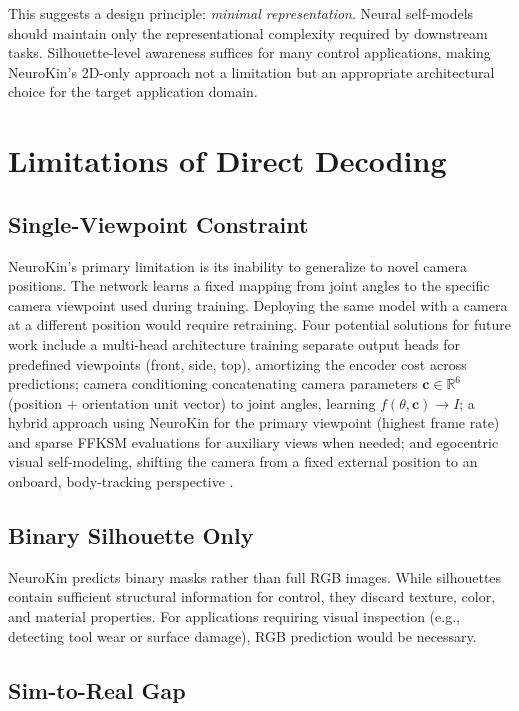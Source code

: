 \documentclass[12pt,a4paper,oneside]{report}
\begin{document}
This suggests a design principle: \textit{minimal representation}. Neural self-models should maintain only the representational complexity required by downstream tasks. Silhouette-level awareness suffices for many control applications, making NeuroKin's 2D-only approach not a limitation but an appropriate architectural choice for the target application domain.

\section{Limitations of Direct Decoding}

\subsection{Single-Viewpoint Constraint}

NeuroKin's primary limitation is its inability to generalize to novel camera positions. The network learns a fixed mapping from joint angles to the specific camera viewpoint used during training. Deploying the same model with a camera at a different position would require retraining. Four potential solutions for future work include a multi-head architecture training separate output heads for predefined viewpoints (front, side, top), amortizing the encoder cost across predictions; camera conditioning concatenating camera parameters $\mathbf{c} \in \mathbb{R}^6$ (position + orientation unit vector) to joint angles, learning $f(\theta, \mathbf{c}) \rightarrow I$; a hybrid approach using NeuroKin for the primary viewpoint (highest frame rate) and sparse FFKSM evaluations for auxiliary views when needed; and egocentric visual self-modeling, shifting the camera from a fixed external position to an onboard, body-tracking perspective \cite{hu2024egocentric}.

\subsection{Binary Silhouette Only}

NeuroKin predicts binary masks rather than full RGB images. While silhouettes contain sufficient structural information for control, they discard texture, color, and material properties. For applications requiring visual inspection (e.g., detecting tool wear or surface damage), RGB prediction would be necessary.

\subsection{Sim-to-Real Gap}
\end{document}
